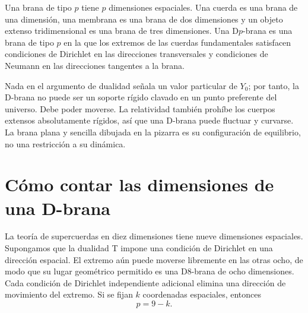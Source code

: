 Una brana de tipo \(p\) tiene \(p\) dimensiones espaciales. Una cuerda es una brana de una dimensión, una membrana es una brana de dos dimensiones y un objeto extenso tridimensional es una brana de tres dimensiones. Una D\(p\)-brana es una brana de tipo \(p\) en la que los extremos de las cuerdas fundamentales satisfacen condiciones de Dirichlet en las direcciones transversales y condiciones de Neumann en las direcciones tangentes a la brana.

Nada en el argumento de dualidad señala un valor particular de \(Y_0\); por tanto, la D-brana no puede ser un soporte rígido clavado en un punto preferente del universo. Debe poder moverse. La relatividad también prohíbe los cuerpos extensos absolutamente rígidos, así que una D-brana puede fluctuar y curvarse. La brana plana y sencilla dibujada en la pizarra es su configuración de equilibrio, no una restricción a su dinámica.

\begin{classroomqa}
\end{classroomqa}

\section{Cómo contar las dimensiones de una D-brana}

La teoría de supercuerdas en diez dimensiones tiene nueve dimensiones espaciales. Supongamos que la dualidad T impone una condición de Dirichlet en una dirección espacial. El extremo aún puede moverse libremente en las otras ocho, de modo que su lugar geométrico permitido es una D8-brana de ocho dimensiones. Cada condición de Dirichlet independiente adicional elimina una dirección de movimiento del extremo. Si se fijan \(k\) coordenadas espaciales, entonces
\begin{equation}
  p=9-k.
  \label{eq:l10-dp-counting}
\end{equation}

